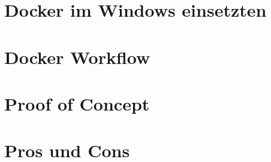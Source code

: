 \documentclass[
10pt, %
a4paper, %
BCOR15mm, %
DIV14, %
footsepline = false, %
headsepline, %
oneside,
openright,
parskip=half, %
abstracton, %
listof=totocnumbered, %
bibliography=totocnumbered %
]{scrreprt}
\begin{document}


\cleardoublepage


\chapter{Docker im Windows einsetzten}\label{chapter:Docker im Windows einsetzten}



\cleardoublepage

  
\chapter{Docker Workflow}\label{chapter:DockerWorkflow}
  



\begingroup
\let\clearpage\relax
\chapter{Proof of Concept}\label{chapter:ProofOfConcept}
\endgroup



\cleardoublepage


\chapter{Pros und Cons}\label{chapter:ProsUndCons}



\cleardoublepage
\end{document}
